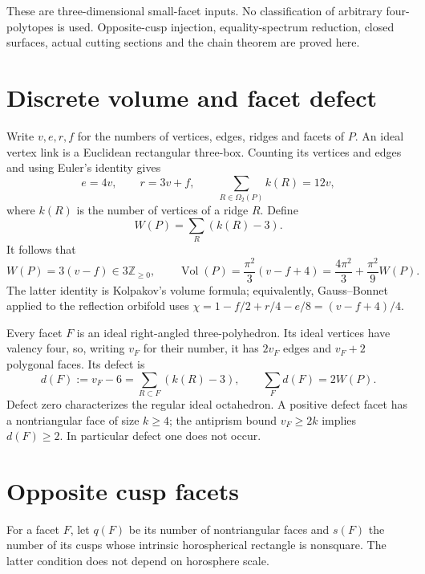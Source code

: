 \documentclass[11pt]{article}
\theoremstyle{remark}
\newcommand{\Vol}{\operatorname{Vol}}
\begin{document}
These are three-dimensional small-facet inputs. No classification
of arbitrary four-polytopes is used. Opposite-cusp injection,
equality-spectrum reduction, closed surfaces, actual cutting
sections and the chain theorem are proved here.

\section{Discrete volume and facet defect}
Write $v,e,r,f$ for the numbers of vertices, edges, ridges and facets of
$P$. An ideal vertex link is a Euclidean rectangular three-box. Counting
its vertices and edges and using Euler's identity gives
\[
 e=4v,\qquad r=3v+f,\qquad
 \sum_{R\in\Omega_2(P)} k(R)=12v,
\]
where $k(R)$ is the number of vertices of a ridge $R$. Define
\[
 W(P)=\sum_R(k(R)-3).
\]
It follows that
\begin{equation}\label{eq:discrete}
 W(P)=3(v-f)\in3\mathbb Z_{\ge0},\qquad
 \Vol(P)=\frac{\pi^2}{3}(v-f+4)
 =\frac{4\pi^2}{3}+\frac{\pi^2}{9}W(P).
\end{equation}
The latter identity is Kolpakov's volume formula; equivalently,
Gauss--Bonnet applied to the reflection orbifold uses
$\chi=1-f/2+r/4-e/8=(v-f+4)/4$.

Every facet $F$ is an ideal right-angled three-polyhedron. Its ideal
vertices have valency four, so, writing $v_F$ for their number, it has
$2v_F$ edges and $v_F+2$ polygonal faces. Its defect is
\begin{equation}\label{eq:facet}
 d(F):=v_F-6=\sum_{R\subset F}(k(R)-3),\qquad
 \sum_F d(F)=2W(P).
\end{equation}
Defect zero characterizes the regular ideal octahedron. A positive
defect facet has a nontriangular face of size $k\ge4$; the antiprism
bound $v_F\ge2k$ implies $d(F)\ge2$. In particular defect one does not
occur.

\section{Opposite cusp facets}
For a facet $F$, let $q(F)$ be its number of nontriangular faces and
$s(F)$ the number of its cusps whose intrinsic horospherical rectangle
is nonsquare. The latter condition does not depend on horosphere scale.
\end{document}
